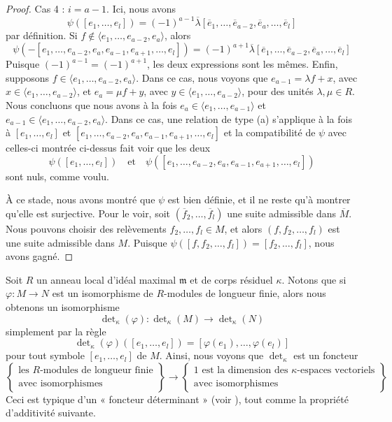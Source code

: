 \begin{proof}
\medskip\noindent
Cas 4 : $i = a - 1$. Ici, nous avons
$$
\psi([e_1, \ldots, e_l]) =
(-1)^{a - 1}
\overline{\lambda}
[\overline{e}_1,
\ldots,
\overline{e}_{a - 2},
\overline{e}_a,
\ldots,
\overline{e}_l]
$$
par définition. Si $f \not \in \langle e_1, \ldots, e_{a - 2}, e_a \rangle$,
alors
$$
\psi(-[e_1, \ldots, e_{a - 2}, e_a, e_{a - 1}, e_{a + 1}, \ldots, e_l]) =
(-1)^{a + 1}\overline{\lambda}
[\overline{e}_1,
\ldots,
\overline{e}_{a - 2},
\overline{e}_a,
\ldots,
\overline{e}_l]
$$
Puisque $(-1)^{a - 1} = (-1)^{a + 1}$, les deux expressions sont les mêmes.
Enfin, supposons $f \in \langle e_1, \ldots, e_{a - 2}, e_a \rangle$.
Dans ce cas, nous voyons que $e_{a - 1} = \lambda f + x$, avec
$x \in \langle e_1, \ldots, e_{a - 2}\rangle$, et
$e_a = \mu f + y$, avec $y \in \langle e_1, \ldots, e_{a - 2}\rangle$,
pour des unités $\lambda, \mu \in R$.
Nous concluons que nous avons à la fois
$e_a \in \langle e_1, \ldots, e_{a - 1} \rangle$ et
$e_{a - 1} \in \langle e_1, \ldots, e_{a - 2}, e_a\rangle$.
Dans ce cas, une relation de type (a) s'applique à la fois à
$[e_1, \ldots, e_l]$ et
$[e_1, \ldots, e_{a - 2}, e_a, e_{a - 1}, e_{a + 1}, \ldots, e_l]$
et la compatibilité de $\psi$ avec celles-ci montrée ci-dessus fait voir que les deux
$$
\psi([e_1, \ldots, e_l])
\quad\text{et}\quad
\psi([e_1, \ldots, e_{a - 2}, e_a, e_{a - 1}, e_{a + 1}, \ldots, e_l])
$$
sont nuls, comme voulu.

\medskip\noindent
À ce stade, nous avons montré que $\psi$ est bien définie, et il ne reste
qu'à montrer qu'elle est surjective. Pour le voir, soit
$(\overline{f}_2, \ldots, \overline{f}_l)$ une suite admissible
dans $\overline{M}$. Nous pouvons choisir des relèvements $f_2, \ldots, f_l \in M$, et
alors $(f, f_2, \ldots, f_l)$ est une suite admissible dans $M$.
Puisque $\psi([f, f_2, \ldots, f_l]) = [f_2, \ldots, f_l]$, nous avons gagné.
\end{proof}

\noindent
Soit $R$ un anneau local d'idéal maximal $\mathfrak m$ et de
corps résiduel $\kappa$. Notons que si $\varphi : M \to N$ est un
isomorphisme de $R$-modules de longueur finie, alors nous obtenons un
isomorphisme
$$
\det\nolimits_\kappa(\varphi) :
\det\nolimits_\kappa(M)
\to
\det\nolimits_\kappa(N)
$$
simplement par la règle
$$
\det\nolimits_\kappa(\varphi)([e_1, \ldots, e_l])
=
[\varphi(e_1), \ldots, \varphi(e_l)]
$$
pour tout symbole $[e_1, \ldots, e_l]$ de $M$.
Ainsi, nous voyons que $\det\nolimits_\kappa$ est un foncteur
\begin{equation}
\label{equation-functor}
\left\{
\begin{matrix}
\text{les }R\text{-modules de longueur finie}\\
\text{avec isomorphismes}
\end{matrix}
\right\}
\longrightarrow
\left\{
\begin{matrix}
1\text{ est la dimension des }\kappa\text{-espaces vectoriels}\\
\text{avec isomorphismes}
\end{matrix}
\right\}
\end{equation}
Ceci est typique d'un « foncteur déterminant »
(voir \cite{Knudsen}), tout comme la propriété d'additivité
suivante.


